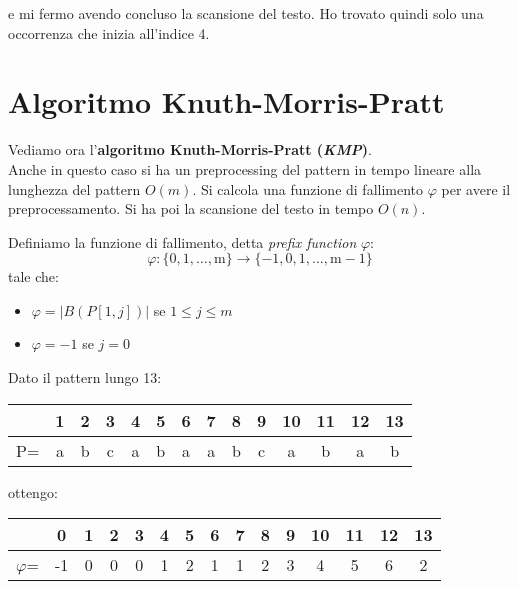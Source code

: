 \begin{esempio}
\begin{center}
  \end{center}
  e mi fermo avendo concluso la scansione del testo. Ho trovato quindi solo una
  occorrenza che inizia all'indice 4.
\end{esempio}
\section{Algoritmo Knuth-Morris-Pratt}
Vediamo ora l'\textbf{algoritmo Knuth-Morris-Pratt (\textit{KMP})}.\\
Anche in questo caso si ha un preprocessing del pattern in tempo lineare alla
lunghezza del pattern $O(m)$. Si calcola una funzione di fallimento $\varphi$
per avere il preprocessamento. Si ha poi la scansione del testo in tempo $O(n)$.
\begin{definizione}
  Definiamo la funzione di fallimento, detta \textit{prefix function}
  $\varphi$: 
  \[\varphi:\{0,1, \ldots, \mathrm{m}\} \rightarrow\{-1,0,1, \ldots,
    \mathrm{m}-1\}\]
  tale che:
  \begin{itemize}
    \item $\varphi=|B(P[1,j])|$ se $1\leq j\leq m$
    \item $\varphi=-1$ se $j=0$
  \end{itemize}
\end{definizione}
\begin{esempio}
  Dato il pattern lungo 13:
  \begin{table}[H]
    \centering
    \begin{tabular}{c||c|c|c|c|c|c|c|c|c|c|c|c|c}
      \hline
      & 1 & 2 & 3 & 4 & 5 & 6 & 7 & 8 & 9 & 10 & 11 & 12 & 13 \\
      \hline
      P=&a& b & c& a& b& a &a &b &c &a&b&a&b\\
      \hline
    \end{tabular}
  \end{table}
  ottengo:
   \begin{table}[H]
    \centering
    \begin{tabular}{c||c|c|c|c|c|c|c|c|c|c|c|c|c|c}
      \hline
      &0 & 1 & 2 & 3 & 4 & 5 & 6 & 7 & 8 & 9 & 10 & 11 & 12 & 13 \\
      \hline
      $\varphi$=&-1& 0 & 0& 0& 1 &2 &1 &1 &2&3&4&5&6&2\\
      \hline
    \end{tabular}
  \end{table}
\end{esempio}
